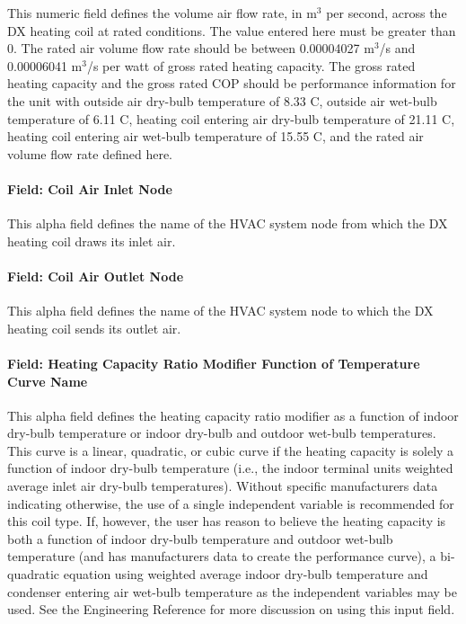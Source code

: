 This numeric field defines the volume air flow rate, in m\(^{3}\) per second, across the DX heating coil at rated conditions. The value entered here must be greater than 0. The rated air volume flow rate should be between 0.00004027 m\(^{3}\)/s and 0.00006041 m\(^{3}\)/s per watt of gross rated heating capacity. The gross rated heating capacity and the gross rated COP should be performance information for the unit with outside air dry-bulb temperature of 8.33 C, outside air wet-bulb temperature of 6.11 C, heating coil entering air dry-bulb temperature of 21.11 C, heating coil entering air wet-bulb temperature of 15.55 C, and the rated air volume flow rate defined here.

\paragraph{Field: Coil Air Inlet Node}\label{field-coil-air-inlet-node}

This alpha field defines the name of the HVAC system node from which the DX heating coil draws its inlet air.

\paragraph{Field: Coil Air Outlet Node}\label{field-coil-air-outlet-node}

This alpha field defines the name of the HVAC system node to which the DX heating coil sends its outlet air.

\paragraph{Field: Heating Capacity Ratio Modifier Function of Temperature Curve Name}\label{field-heating-capacity-ratio-modifier-function-of-temperature-curve-name}

This alpha field defines the heating capacity ratio modifier as a function of indoor dry-bulb temperature or indoor dry-bulb and outdoor wet-bulb temperatures. This curve is a linear, quadratic, or cubic curve if the heating capacity is solely a function of indoor dry-bulb temperature (i.e., the indoor terminal units weighted average inlet air dry-bulb temperatures). Without specific manufacturers data indicating otherwise, the use of a single independent variable is recommended for this coil type. If, however, the user has reason to believe the heating capacity is both a function of indoor dry-bulb temperature and outdoor wet-bulb temperature (and has manufacturers data to create the performance curve), a bi-quadratic equation using weighted average indoor dry-bulb temperature and condenser entering air wet-bulb temperature as the independent variables may be used. See the Engineering Reference for more discussion on using this input field.

